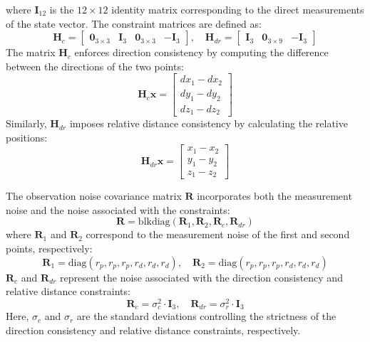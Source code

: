 where $\mathbf{I}_{12}$ is the $12 \times 12$ identity matrix corresponding to the direct measurements of the state vector. The constraint matrices are defined as:
\begin{equation}
\mathbf{H}_c = \begin{bmatrix}
\mathbf{0}_{3 \times 3} & \mathbf{I}_3 & \mathbf{0}_{3 \times 3} & -\mathbf{I}_3
\end{bmatrix}, \quad
\mathbf{H}_{dr} = \begin{bmatrix}
\mathbf{I}_3 & \mathbf{0}_{3 \times 9} & -\mathbf{I}_3
\end{bmatrix}
\end{equation}
The matrix $\mathbf{H}_c$ enforces direction consistency by computing the difference between the directions of the two points:
\begin{equation}
\mathbf{H}_c \mathbf{x} = \begin{bmatrix}
dx_1 - dx_2 \\
dy_1 - dy_2 \\
dz_1 - dz_2
\end{bmatrix}
\end{equation}
Similarly, $\mathbf{H}_{dr}$ imposes relative distance consistency by calculating the relative positions:
\begin{equation}
\mathbf{H}_{dr} \mathbf{x} = \begin{bmatrix}
x_1 - x_2 \\
y_1 - y_2 \\
z_1 - z_2
\end{bmatrix}
\end{equation}

The observation noise covariance matrix $\mathbf{R}$ incorporates both the measurement noise and the noise associated with the constraints:
\begin{equation}
\mathbf{R} = \text{blkdiag}(\mathbf{R}_1, \mathbf{R}_2, \mathbf{R}_c, \mathbf{R}_{dr})
\end{equation}
where $\mathbf{R}_1$ and $\mathbf{R}_2$ correspond to the measurement noise of the first and second points, respectively:
\begin{equation}
\mathbf{R}_1 = \text{diag}(r_p, r_p, r_p, r_d, r_d, r_d), \quad
\mathbf{R}_2 = \text{diag}(r_p, r_p, r_p, r_d, r_d, r_d)
\end{equation}
$\mathbf{R}_c$ and $\mathbf{R}_{dr}$ represent the noise associated with the direction consistency and relative distance constraints:
\begin{equation}
\mathbf{R}_c = \sigma_c^2 \cdot \mathbf{I}_3, \quad
\mathbf{R}_{dr} = \sigma_r^2 \cdot \mathbf{I}_3
\end{equation}
Here, $\sigma_c$ and $\sigma_r$ are the standard deviations controlling the strictness of the direction consistency and relative distance constraints, respectively.

